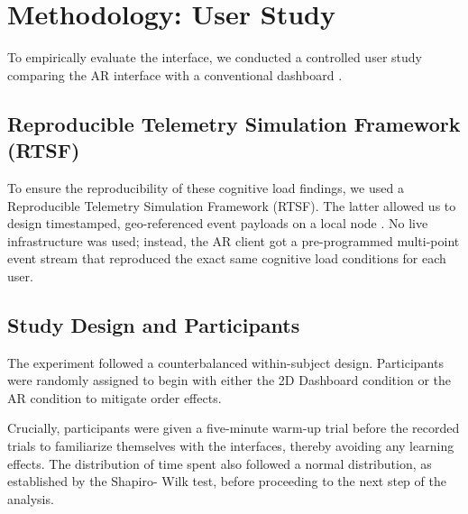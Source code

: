 \documentclass[conference]{IEEEtran}
\begin{document}
\section{Methodology: User Study}

To empirically evaluate the interface, we conducted a controlled user study comparing the AR interface with a conventional dashboard \cite{b6}. 

\subsection{Reproducible Telemetry Simulation Framework (RTSF)}
To ensure the reproducibility of these cognitive load findings, we used a Reproducible Telemetry Simulation Framework (RTSF). The latter allowed us to design timestamped, geo-referenced event payloads on a local node \cite{b12}. No live infrastructure was used; instead, the AR client got a pre-programmed multi-point event stream that reproduced the exact same cognitive load conditions for each user.

\subsection{Study Design and Participants}
The experiment followed a counterbalanced within-subject design. Participants were randomly assigned to begin with either the 2D Dashboard condition or the AR condition to mitigate order effects. 

Crucially, participants were given a five-minute warm-up trial before the recorded trials to familiarize themselves with the interfaces, thereby avoiding any learning effects. The distribution of time spent also followed a normal distribution, as established by the Shapiro- Wilk test, before proceeding to the next step of the analysis.

\begin{table}[htbp]
\caption{User Study Participant Demographics}
\begin{center}
\end{center}
\label{tab:participants}
\end{table}
\end{document}
